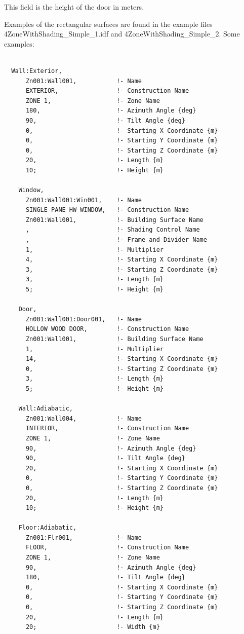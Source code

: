 This field is the height of the door in meters.

Examples of the rectangular surfaces are found in the example files 4ZoneWithShading\_Simple\_1.idf and 4ZoneWithShading\_Simple\_2. Some examples:

\begin{lstlisting}

  Wall:Exterior,
      Zn001:Wall001,           !- Name
      EXTERIOR,                !- Construction Name
      ZONE 1,                  !- Zone Name
      180,                     !- Azimuth Angle {deg}
      90,                      !- Tilt Angle {deg}
      0,                       !- Starting X Coordinate {m}
      0,                       !- Starting Y Coordinate {m}
      0,                       !- Starting Z Coordinate {m}
      20,                      !- Length {m}
      10;                      !- Height {m}

    Window,
      Zn001:Wall001:Win001,    !- Name
      SINGLE PANE HW WINDOW,   !- Construction Name
      Zn001:Wall001,           !- Building Surface Name
      ,                        !- Shading Control Name
      ,                        !- Frame and Divider Name
      1,                       !- Multiplier
      4,                       !- Starting X Coordinate {m}
      3,                       !- Starting Z Coordinate {m}
      3,                       !- Length {m}
      5;                       !- Height {m}

    Door,
      Zn001:Wall001:Door001,   !- Name
      HOLLOW WOOD DOOR,        !- Construction Name
      Zn001:Wall001,           !- Building Surface Name
      1,                       !- Multiplier
      14,                      !- Starting X Coordinate {m}
      0,                       !- Starting Z Coordinate {m}
      3,                       !- Length {m}
      5;                       !- Height {m}

    Wall:Adiabatic,
      Zn001:Wall004,           !- Name
      INTERIOR,                !- Construction Name
      ZONE 1,                  !- Zone Name
      90,                      !- Azimuth Angle {deg}
      90,                      !- Tilt Angle {deg}
      20,                      !- Starting X Coordinate {m}
      0,                       !- Starting Y Coordinate {m}
      0,                       !- Starting Z Coordinate {m}
      20,                      !- Length {m}
      10;                      !- Height {m}

    Floor:Adiabatic,
      Zn001:Flr001,            !- Name
      FLOOR,                   !- Construction Name
      ZONE 1,                  !- Zone Name
      90,                      !- Azimuth Angle {deg}
      180,                     !- Tilt Angle {deg}
      0,                       !- Starting X Coordinate {m}
      0,                       !- Starting Y Coordinate {m}
      0,                       !- Starting Z Coordinate {m}
      20,                      !- Length {m}
      20;                      !- Width {m}


\end{lstlisting}
